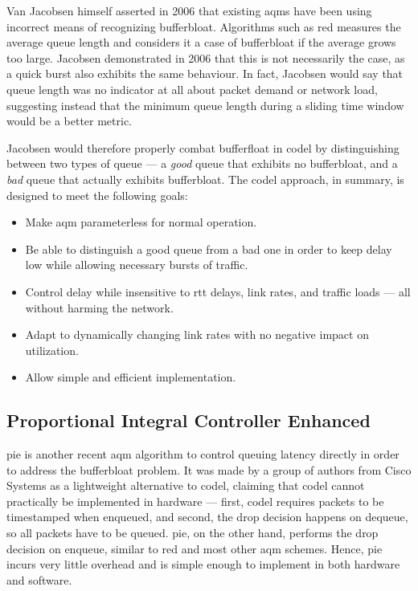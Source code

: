 Van Jacobsen himself asserted in 2006 that existing \gls{aqm}s have been using incorrect means of recognizing bufferbloat. \cite{a_rant_on_queues} Algorithms such as \gls{red} measures the average queue length and considers it a case of bufferbloat if the average grows too large. Jacobsen demonstrated in 2006 that this is not necessarily the case, as a quick burst also exhibits the same behaviour. In fact, Jacobsen would say that queue length was no indicator at all about packet demand or network load, \cite{a_rant_on_queues, controlling_queue_delay} suggesting instead that the minimum queue length during a sliding time window would be a better metric. \cite{controlling_queue_delay}

Jacobsen would therefore properly combat bufferfloat in \gls{codel} by distinguishing between two types of queue --- a \textit{good} queue that exhibits no bufferbloat, and a \textit{bad} queue that actually exhibits bufferbloat. The \gls{codel} approach, in summary, is designed to meet the following goals: \cite{rfc8289}

\begin{itemize}
    \item Make \gls{aqm} parameterless for normal operation.
    \item Be able to distinguish a good queue from a bad one in order to keep delay low while allowing necessary bursts of traffic.
    \item Control delay while insensitive to \gls{rtt} delays, link rates, and traffic loads --- all without harming the network.
    \item Adapt to dynamically changing link rates with no negative impact on utilization.
    \item Allow simple and efficient implementation.
\end{itemize}




\subsection{Proportional Integral Controller Enhanced}

\gls{pie} is another recent \gls{aqm} algorithm to control queuing latency directly in order to address the bufferbloat problem. It was made by a group of authors from Cisco Systems as a lightweight alternative to \gls{codel}, claiming that \gls{codel} cannot practically be implemented in hardware --- first, \gls{codel} requires packets to be timestamped when enqueued, and second, the drop decision happens on dequeue, so all packets have to be queued. \gls{pie}, on the other hand, performs the drop decision on enqueue, similar to \gls{red} and most other \gls{aqm} schemes. Hence, \gls{pie} incurs very little overhead and is simple enough to implement in both hardware and software.

